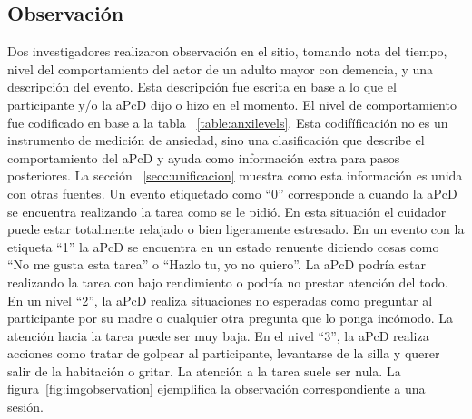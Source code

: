 	\subsection{Observaci\'on}
	Dos investigadores realizaron observaci\'on en el sitio, tomando nota del tiempo, nivel del comportamiento del actor de un adulto mayor con demencia, y una descripci\'on del evento. Esta descripci\'on fue escrita en base a lo que el participante y/o la aPcD dijo o hizo en el momento. El nivel de comportamiento fue codificado en base a la tabla ~\ref{table:anxilevels}. Esta codif\'ificaci\'on no es un instrumento de medici\'on de ansiedad, sino una clasificaci\'on que describe el comportamiento del aPcD y ayuda como informaci\'on extra para pasos posteriores. La secci\'on ~\ref{secc:unificacion} muestra como esta informaci\'on es unida con otras fuentes. Un evento etiquetado como ``0'' corresponde a cuando la aPcD se encuentra realizando la tarea como se le pidi\'o. En esta situaci\'on el cuidador puede estar totalmente relajado o bien ligeramente estresado. En un evento con la etiqueta ``1'' la aPcD se encuentra en un estado renuente diciendo cosas como ``No me gusta esta tarea'' o ``Hazlo tu, yo no quiero''. La aPcD podr\'ia estar realizando la tarea con bajo rendimiento o podr\'ia no prestar atenci\'on del todo. En un nivel ``2'', la aPcD realiza situaciones no esperadas como preguntar al participante por su madre o cualquier otra pregunta que lo ponga inc\'omodo. La atenci\'on hacia la tarea puede ser muy baja. En el nivel ``3'', la aPcD realiza acciones como tratar de golpear al participante, levantarse de la silla y querer salir de la habitaci\'on o gritar. La atenci\'on a la tarea suele ser nula. La figura~\ref{fig:imgobservation} ejemplifica la observaci\'on correspondiente a una sesi\'on.

